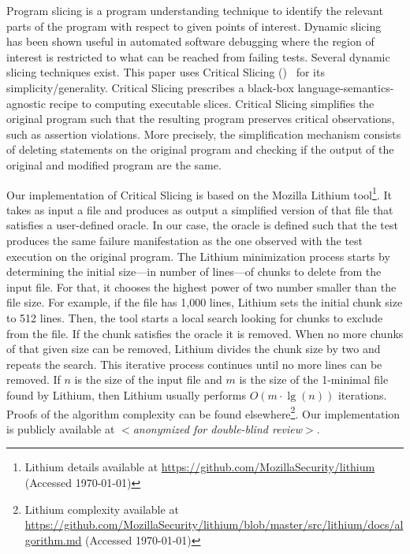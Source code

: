 \documentclass{article}
\begin{document}
Program slicing is a program understanding technique to identify the
relevant parts of the program with respect to given points of
interest. Dynamic
slicing~\cite{Agrawal:1990:DPS:93542.93576}
has been shown useful in automated software debugging where the region
of interest is restricted to what can be reached from failing
tests. Several dynamic slicing techniques exist. This paper uses
Critical Slicing (\cs{})~\cite{DeMillo:1996:CSS:229000.226310} for its
simplicity/generality. Critical Slicing
prescribes a black-box language-semantics-agnostic recipe to computing
executable slices.  Critical Slicing simplifies the original
program such that the resulting program preserves critical
observations, such as assertion violations. More precisely, the
simplification mechanism consists of deleting statements on the
original program and checking if the output of the original and
modified program are the same.

Our implementation of Critical Slicing is based on the Mozilla Lithium
tool\footnote{Lithium details available at {\footnotesize\url{https://github.com/MozillaSecurity/lithium}} (Accessed \today)}. It takes as input a file
and produces as output a simplified version of that file that
satisfies a user-defined oracle. In our case, the oracle is defined
such that the test produces the same failure manifestation as the one
observed with the test execution on the original program. The
Lithium minimization process starts by determining the initial size---in
number of lines---of chunks to delete from the input file. For that,
it chooses the highest power of two number smaller than the file
size. For example, if the file has 1,000 lines, Lithium sets the
initial chunk size to 512 lines. Then, the tool starts a local search looking
for chunks to exclude from the file. If the chunk satisfies the oracle it is removed.
When no more chunks of that given size can be removed, Lithium
divides the chunk size by two and repeats the search. This iterative
process continues until no more lines can be removed.  If $n$ is the
size of the input file and $m$ is the size of the 1-minimal file found
by Lithium, then Lithium usually performs $O(m\cdot\lg(n))$
iterations. Proofs of the algorithm complexity can be found
elsewhere\footnote{Lithium complexity available at \url{https://github.com/MozillaSecurity/lithium/blob/master/src/lithium/docs/algorithm.md} (Accessed \today)}. Our implementation is publicly
available at \textit{$<$anonymized for double-blind review$>$}.
\end{document}
